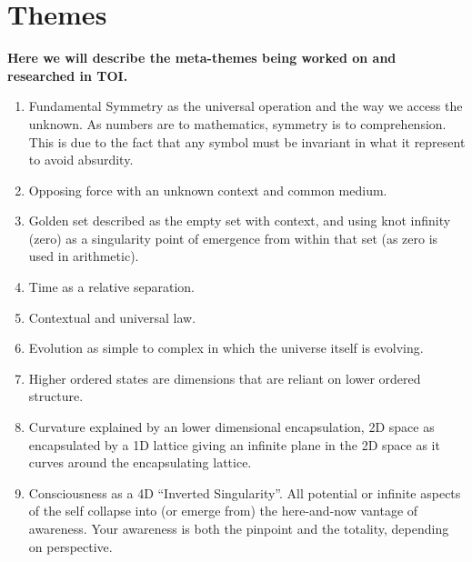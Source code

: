 \documentclass[11pt]{article}
\begin{document}
\section*{Themes}

\textbf{Here we will describe the meta-themes being worked on and researched in TOI.}

\begin{enumerate}
    \item Fundamental Symmetry as the universal operation and the way we access the unknown. As numbers are to mathematics, symmetry is to comprehension. This is due to the fact that any symbol must be invariant in what it represent to avoid absurdity.
    \item Opposing force with an unknown context and common medium.
    \item Golden set described as the empty set with context, and using knot infinity (zero) as a singularity point of emergence from within that set (as zero is used in arithmetic).
    \item Time as a relative separation.
    \item Contextual and universal law.
    \item Evolution as simple to complex in which the universe itself is evolving.
    \item Higher ordered states are dimensions that are reliant on lower ordered structure.
    \item Curvature explained by an lower dimensional encapsulation, 2D space as encapsulated by a 1D lattice giving an infinite plane in the 2D space as it curves around the encapsulating lattice.
    \item Consciousness as a 4D “Inverted Singularity”. All potential or infinite aspects of the self collapse into (or emerge from) the here-and-now vantage of awareness. Your awareness is both the pinpoint and the totality, depending on perspective.
\end{enumerate}

\printbibliography
\end{document}
